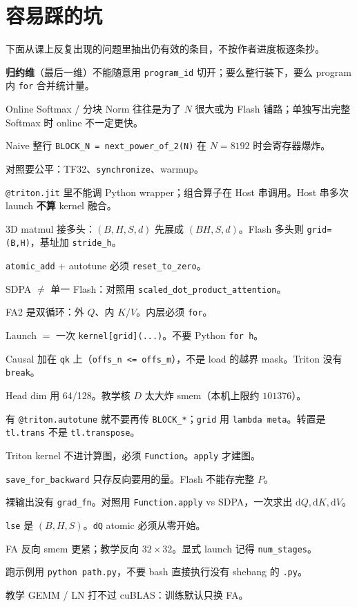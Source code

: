\chapter{容易踩的坑}

下面从课上反复出现的问题里抽出仍有效的条目，不按作者进度板逐条抄。

\begin{problemset}[课上反复出现的坑]
  \item \textbf{归约维}（最后一维）不能随意用 \texttt{program\_id} 切开；要么整行装下，要么 program 内 \texttt{for} 合并统计量。
  \item Online Softmax / 分块 Norm 往往是为了 $N$ 很大或为 Flash 铺路；单独写出完整 Softmax 时 online 不一定更快。
  \item Naive 整行 \texttt{BLOCK\_N = next\_power\_of\_2(N)} 在 $N=8192$ 时会寄存器爆炸。
  \item 对照要公平：TF32、\texttt{synchronize}、warmup。
  \item \texttt{@triton.jit} 里不能调 Python wrapper；组合算子在 Host 串调用。Host 串多次 launch \textbf{不算} kernel 融合。
  \item 3D matmul 接多头：$(B,H,S,d)$ 先展成 $(BH,S,d)$。Flash 多头则 \texttt{grid=(B,H)}，基址加 \texttt{stride\_h}。
  \item \texttt{atomic\_add} + autotune 必须 \texttt{reset\_to\_zero}。
  \item SDPA $\ne$ 单一 Flash：对照用 \texttt{scaled\_dot\_product\_attention}。
  \item FA2 是双循环：外 $Q$、内 $K/V$。内层必须 \texttt{for}。
  \item Launch $=$ 一次 \texttt{kernel[grid](...)}。不要 Python \texttt{for h}。
  \item Causal 加在 \texttt{qk} 上（\texttt{offs\_n <= offs\_m}），不是 load 的越界 mask。Triton 没有 \texttt{break}。
  \item Head dim 用 64/128。教学核 $D$ 太大炸 smem（本机上限约 $101376$）。
  \item 有 \texttt{@triton.autotune} 就不要再传 \texttt{BLOCK\_*}；\texttt{grid} 用 \texttt{lambda meta}。转置是 \texttt{tl.trans} 不是 \texttt{tl.transpose}。
  \item Triton kernel 不进计算图，必须 \texttt{Function}。\texttt{apply} 才建图。
  \item \texttt{save\_for\_backward} 只存反向要用的量。Flash 不能存完整 $P$。
  \item 裸输出没有 \texttt{grad\_fn}。对照用 \texttt{Function.apply} vs SDPA，一次求出 $\mathrm{d}Q,\mathrm{d}K,\mathrm{d}V$。
  \item \texttt{lse} 是 $(B,H,S)$。\texttt{dQ} atomic 必须从零开始。
  \item FA 反向 smem 更紧；教学反向 $32\times 32$。显式 launch 记得 \texttt{num\_stages}。
  \item 跑示例用 \texttt{python path.py}，不要 bash 直接执行没有 shebang 的 \texttt{.py}。
  \item 教学 GEMM / LN 打不过 cuBLAS：训练默认只换 FA。
\end{problemset}

